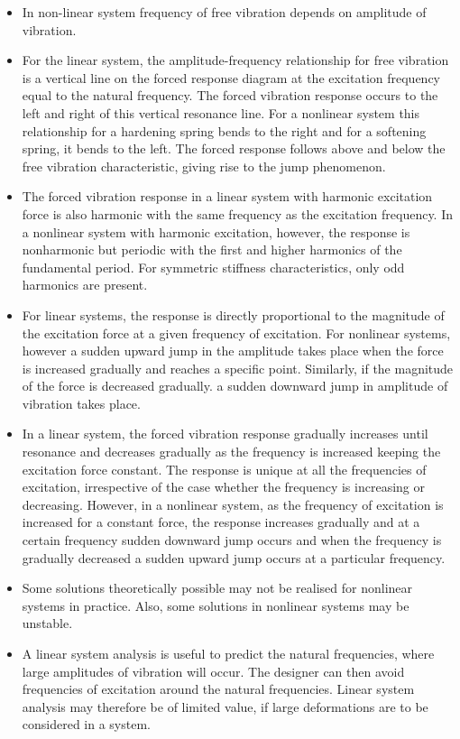 \begin{itemize}
\item In non-linear system frequency of free vibration depends on amplitude of vibration.
\item For the linear system, the amplitude-frequency relationship for free vibration is a vertical line on the forced response diagram at the excitation frequency equal to the natural frequency. The forced vibration response occurs to the left and right of this vertical resonance line. For a nonlinear system this relationship for a hardening spring bends to the right and for a softening spring, it bends to the left. The forced response follows above and below the free vibration characteristic, giving rise to the jump phenomenon. 
\item The forced vibration response in a linear system with harmonic excitation force is also harmonic with the same frequency as the excitation frequency. In a nonlinear system with harmonic excitation, however, the response is nonharmonic but periodic with the first and higher harmonics of the fundamental period. For symmetric stiffness characteristics, only odd harmonics are present.
\item  For linear systems, the response is directly proportional to the magnitude of the excitation force at a given frequency of excitation. For nonlinear systems, however a sudden upward jump in the amplitude takes place when the force is increased gradually and reaches a specific point. Similarly, if the magnitude of the force is decreased gradually. a sudden downward jump in amplitude of vibration takes place.
\item In a linear system, the forced vibration response gradually increases until resonance and decreases gradually as the frequency is increased keeping the excitation force constant. The response is unique at all the frequencies of excitation, irrespective of the case whether the frequency is increasing or decreasing. However, in a nonlinear system, as the frequency of excitation is increased for a constant force, the response increases gradually and at a certain frequency sudden downward jump occurs and when the frequency is gradually decreased a sudden upward jump occurs at a particular frequency. 
\item Some solutions theoretically possible may not be realised for nonlinear systems in practice. Also, some solutions in nonlinear systems may be unstable.
\item  A linear system analysis is useful to predict the natural frequencies, where large amplitudes of vibration will occur. The designer can then avoid frequencies of excitation around the natural frequencies. Linear system analysis may therefore be of limited value, if large deformations are to be considered in a system.
\end{itemize}

